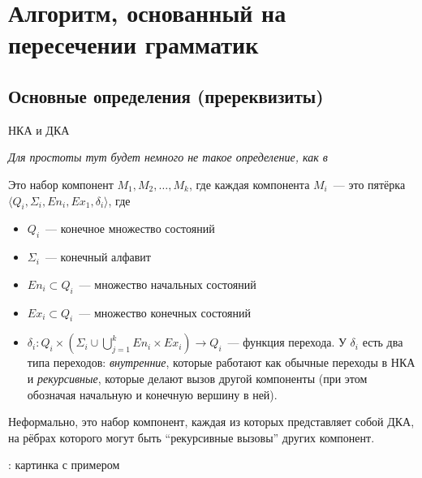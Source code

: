 \section{Алгоритм, основанный на пересечении грамматик}

\subsection*{Основные определения (пререквизиты)}

\begin{definition}
    НКА и ДКА
    
\end{definition}

\begin{definition}
    \textit{Для простоты тут будет немного не такое определение, как в~\cite{Alur05}}

    Это набор компонент $M_1, M_2, \dots , M_k$, где каждая компонента $M_i$~--- это пятёрка $\langle Q_i, \Sigma_i, En_i, Ex_1, \delta_i \rangle$, где 
        \begin{itemize}
            \item $Q_i$~--- конечное множество состояний
            \item $\Sigma_i$~--- конечный алфавит
            \item $En_i \subset Q_i$~--- множество начальных состояний
            \item $Ex_i \subset Q_i$~--- множество конечных состояний
            \item $\delta_i \colon Q_i \times (\Sigma_i \cup \bigcup\limits_{j = 1}^k En_i \times Ex_i ) \to Q_i$~--- функция перехода. У $\delta_i$ есть два типа переходов: \textit{внутренние}, которые работают как обычные переходы в НКА и \textit{рекурсивные}, которые делают вызов другой компоненты (при этом обозначая начальную и конечную вершину в ней).
        \end{itemize}

    Неформально, это набор компонент, каждая из которых представляет собой ДКА, на рёбрах которого могут быть ``рекурсивные вызовы'' других компонент.

    \TODO: картинка с примером
    
\end{definition}

\begin{definition}
\end{definition}

